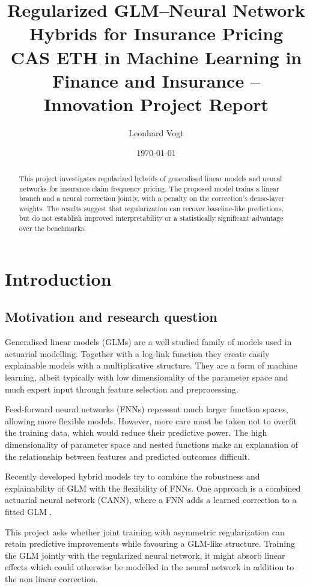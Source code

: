 \documentclass[a4paper]{article}
\title{Regularized GLM--Neural Network Hybrids for Insurance Pricing\\
\large CAS ETH in Machine Learning in Finance and Insurance -- Innovation Project Report}
\author{Leonhard Vogt}
\date{\today}
\begin{document}
\maketitle

\begin{abstract}
This project investigates regularized hybrids of generalised linear models
and neural networks for insurance claim frequency pricing.
The proposed model trains a linear branch and a neural correction jointly,
with a penalty on the correction's dense-layer weights.
The results suggest that regularization can recover
baseline-like predictions, but do not establish improved interpretability
or a statistically significant advantage over the benchmarks.
\end{abstract}

\section{Introduction}
\subsection{Motivation and research question}
Generalised linear models (GLMs) are a well studied family of models used in actuarial modelling. Together with a log-link function they create easily explainable models with a multiplicative structure.
They are a form of machine learning, albeit typically with low dimensionality of the parameter space and much expert input through feature selection and preprocessing.

Feed-forward neural networks (FNNs) represent much larger function spaces, allowing  more flexible models. However, more care must be taken not to overfit the training data, which would reduce their predictive power. The high dimensionality of parameter space and nested functions make an explanation of the relationship between features and predicted outcomes difficult.

Recently developed hybrid models try to combine the robustness and explainability of GLM with the flexibility of FNNs. One approach is a combined actuarial neural network (CANN), where a FNN adds a learned correction to a fitted GLM \cite{aitools,nesting}.

This project asks whether joint training with asymmetric regularization
can retain predictive improvements while favouring a GLM-like structure.
Training the GLM jointly with the regularized neural network, it might absorb linear effects which could otherwise be modelled in the neural network in addition to the non linear correction.
\end{document}
